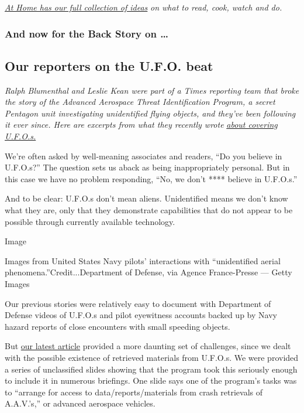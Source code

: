 \href{https://www.nytimes.com/spotlight/at-home}{\emph{At Home has our
full collection of ideas}} \emph{on what to read, cook, watch and do.}

\hypertarget{and-now-for-the-back-story-on-}{%
\subsubsection{And now for the Back Story on
\ldots{}}\label{and-now-for-the-back-story-on-}}

\hypertarget{our-reporters-on-the-ufo-beat}{%
\subsection{Our reporters on the U.F.O.
beat}\label{our-reporters-on-the-ufo-beat}}

\emph{Ralph Blumenthal and Leslie Kean were part of a Times reporting
team that broke the story of the Advanced Aerospace Threat
Identification Program, a secret Pentagon unit investigating
unidentified flying objects, and they've been following it ever since.
Here are excerpts from what they recently wrote}
\href{https://www.nytimes.com/2020/07/28/insider/UFO-reporting.html}{\emph{about
covering U.F.O.s.}}

We're often asked by well-meaning associates and readers, ``Do you
believe in U.F.O.s?'' The question sets us aback as being
inappropriately personal. But in this case we have no problem
responding, ``No, we don't **** believe in U.F.O.s.''

And to be clear: U.F.O.s don't mean aliens. Unidentified means we don't
know what they are, only that they demonstrate capabilities that do not
appear to be possible through currently available technology.

Image

Images from United States Navy pilots' interactions with ``unidentified
aerial phenomena.''Credit...Department of Defense, via Agence
France-Presse --- Getty Images

Our previous stories were relatively easy to document with Department of
Defense videos of U.F.O.s and pilot eyewitness accounts backed up by
Navy hazard reports of close encounters with small speeding objects.

But
\href{https://www.nytimes.com/2020/07/23/us/politics/pentagon-ufo-harry-reid-navy.html?searchResultPosition=1}{our
latest article} provided a more daunting set of challenges, since we
dealt with the possible existence of retrieved materials from U.F.O.s.
We were provided a series of unclassified slides showing that the
program took this seriously enough to include it in numerous briefings.
One slide says one of the program's tasks was to ``arrange for access to
data/reports/materials from crash retrievals of A.A.V.'s,'' or advanced
aerospace vehicles.


